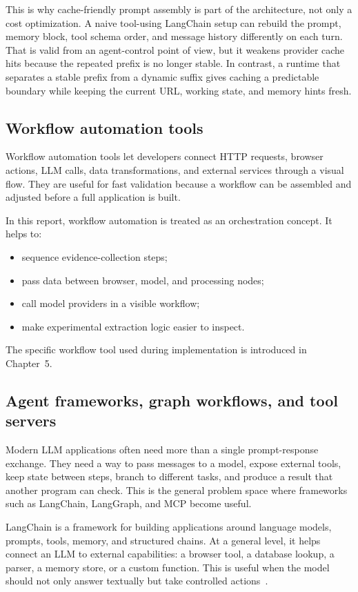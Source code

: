 This is why cache-friendly prompt assembly is part of the architecture, not only a cost
optimization. A naive tool-using LangChain setup can rebuild the prompt, memory block,
tool schema order, and message history differently on each turn. That is valid from an
agent-control point of view, but it weakens provider cache hits because the repeated
prefix is no longer stable. In contrast, a runtime that separates a stable prefix from a
dynamic suffix gives caching a predictable boundary while keeping the current URL,
working state, and memory hints fresh.

\subsection{Workflow automation tools}

Workflow automation tools let developers connect HTTP requests, browser actions, LLM
calls, data transformations, and external services through a visual flow. They are
useful for fast validation because a workflow can be assembled and adjusted before a
full application is built.

In this report, workflow automation is treated as an orchestration concept. It helps
to:
\begin{itemize}
  \item sequence evidence-collection steps;
  \item pass data between browser, model, and processing nodes;
  \item call model providers in a visible workflow;
  \item make experimental extraction logic easier to inspect.
\end{itemize}

The specific workflow tool used during implementation is introduced in Chapter~5.

\subsection{Agent frameworks, graph workflows, and tool servers}

Modern LLM applications often need more than a single prompt-response exchange. They
need a way to pass messages to a model, expose external tools, keep state between
steps, branch to different tasks, and produce a result that another program can check.
This is the general problem space where frameworks such as LangChain, LangGraph, and
MCP become useful.

LangChain is a framework for building applications around language models, prompts,
tools, memory, and structured chains. At a general level, it helps connect an LLM to
external capabilities: a browser tool, a database lookup, a parser, a memory store, or a
custom function. This is useful when the model should not only answer textually but take
controlled actions~\cite{langchain-docs}.


